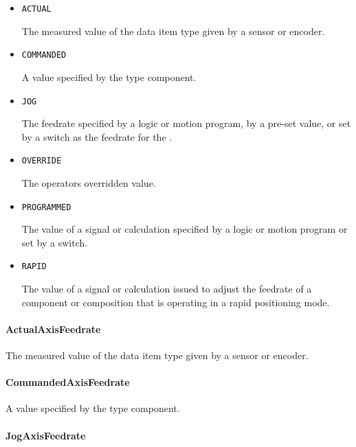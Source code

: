 \begin{itemize}

\item \texttt{ACTUAL}


The measured value of the data item type given by a sensor or encoder.

\item \texttt{COMMANDED}


A value specified by the  type component.

\item \texttt{JOG}


The feedrate specified by a logic or motion program, by a pre-set value, or set by a switch as the feedrate for the . 

\item \texttt{OVERRIDE}


The operators overridden value.

\item \texttt{PROGRAMMED}


The value of a signal or calculation specified by a logic or motion program or set by a switch.

\item \texttt{RAPID}


The value of a signal or calculation issued to adjust the feedrate of a component or composition that is operating in a rapid positioning mode.


\end{itemize}

\paragraph{ActualAxisFeedrate}\mbox{}
\label{sec:ActualAxisFeedrate}


The measured value of the data item type given by a sensor or encoder.


\paragraph{CommandedAxisFeedrate}\mbox{}
\label{sec:CommandedAxisFeedrate}


A value specified by the  type component.


\paragraph{JogAxisFeedrate}\mbox{}
\label{sec:JogAxisFeedrate}


